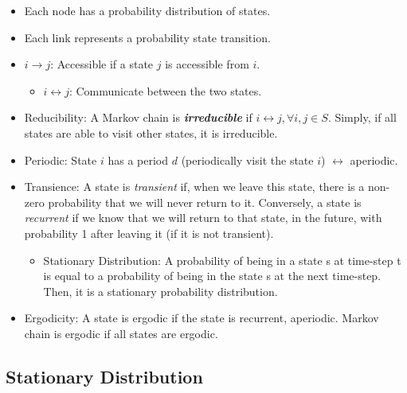 \begin{itemize}
	\item Each node has a probability distribution of states.
	\item Each link represents a probability state transition.  
	\item $i \to j$: Accessible if a state $j$ is accessible from $i$. 
		\begin{itemize}
			\item $i \leftrightarrow j$: Communicate between the two states.
		\end{itemize}
	\item Reducibility: A Markov chain is \textbf{\textit{irreducible}} if $i\leftrightarrow j, \forall i,j\in S$. Simply, if all states are able to visit other states, it is irreducible. 
	\item Periodic: State $i$ has a period $d$ (\ie periodically visit the state $i$) $\leftrightarrow$ aperiodic.
	\item Transience: A state is \textit{transient} if, when we leave this state, there is a non-zero probability that we will never return to it. Conversely, a state is \textit{recurrent} if we know that we will return to that state, in the future, with probability 1 after leaving it (if it is not transient). 
		\begin{itemize}
			\item Stationary Distribution: A probability of being in a state s at time-step t is equal to a probability of being in the state s at the next time-step. Then, it is a stationary probability distribution.
		\end{itemize}
	\item Ergodicity: A state is ergodic if the state is recurrent, aperiodic. Markov chain is ergodic if all states are ergodic. 
\end{itemize}

\subsection{Stationary Distribution}


